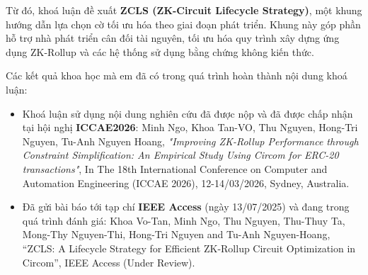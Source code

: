 Từ đó, khoá luận đề xuất \textbf{ZCLS (ZK-Circuit Lifecycle Strategy)}, một khung hướng dẫn lựa chọn cờ tối ưu hóa theo giai đoạn phát triển. Khung này góp phần hỗ trợ nhà phát triển cân đối tài nguyên, tối ưu hóa quy trình xây dựng ứng dụng ZK-Rollup và các hệ thống sử dụng bằng chứng không kiến thức. 

Các kết quả khoa học mà em đã có trong quá trình hoàn thành nội dung khoá luận:
\begin{itemize}
    \item Khoá luận sử dụng nội dung nghiên cứu đã được nộp và đã được chấp nhận tại hội nghị \textbf{ICCAE2026}: Minh Ngo, Khoa Tan-VO, Thu Nguyen, Hong-Tri Nguyen, Tu-Anh Nguyen Hoang, \textit{"Improving ZK-Rollup Performance through Constraint Simplification: An Empirical Study Using Circom for ERC-20 transactions"}, In The 18th International Conference on Computer and Automation Engineering (ICCAE 2026), 12-14/03/2026, Sydney, Australia.

    \item Đã gửi bài báo tới tạp chí \textbf{IEEE Access} (ngày 13/07/2025) và đang trong quá trình đánh giá: Khoa Vo-Tan, Minh Ngo, Thu Nguyen, Thu-Thuy Ta, Mong-Thy Nguyen-Thi, Hong-Tri Nguyen and Tu-Anh Nguyen-Hoang, “ZCLS: A Lifecycle Strategy for Efficient ZK-Rollup Circuit Optimization in Circom”, IEEE Access (Under Review).
\end{itemize}

